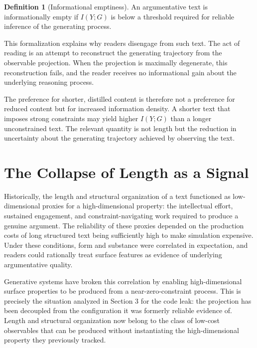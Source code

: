 \documentclass[12pt, oneside]{article}
\theoremstyle{plain}
\theoremstyle{definition}
\newtheorem{definition}[theorem]{Definition}
\theoremstyle{remark}
\begin{document}
\begin{definition}[Informational emptiness]
An argumentative text is informationally empty if $I(Y; G)$ is below a threshold required
for reliable inference of the generating process.
\end{definition}

This formalization explains why readers disengage from such text. The act of reading is an
attempt to reconstruct the generating trajectory from the observable projection. When the
projection is maximally degenerate, this reconstruction fails, and the reader receives no
informational gain about the underlying reasoning process.

The preference for shorter, distilled content is therefore not a preference for reduced
content but for increased information density. A shorter text that imposes strong
constraints may yield higher $I(Y; G)$ than a longer unconstrained text. The relevant
quantity is not length but the reduction in uncertainty about the generating trajectory
achieved by observing the text.

\section{The Collapse of Length as a Signal}

Historically, the length and structural organization of a text functioned as low-dimensional
proxies for a high-dimensional property: the intellectual effort, sustained engagement, and
constraint-navigating work required to produce a genuine argument. The reliability of these
proxies depended on the production costs of long structured text being sufficiently high to
make simulation expensive. Under these conditions, form and substance were correlated in
expectation, and readers could rationally treat surface features as evidence of underlying
argumentative quality.

Generative systems have broken this correlation by enabling high-dimensional surface
properties to be produced from a near-zero-constraint process. This is precisely the
situation analyzed in Section 3 for the code leak: the projection has been decoupled from
the configuration it was formerly reliable evidence of. Length and structural organization
now belong to the class of low-cost observables that can be produced without instantiating
the high-dimensional property they previously tracked.
\end{document}
